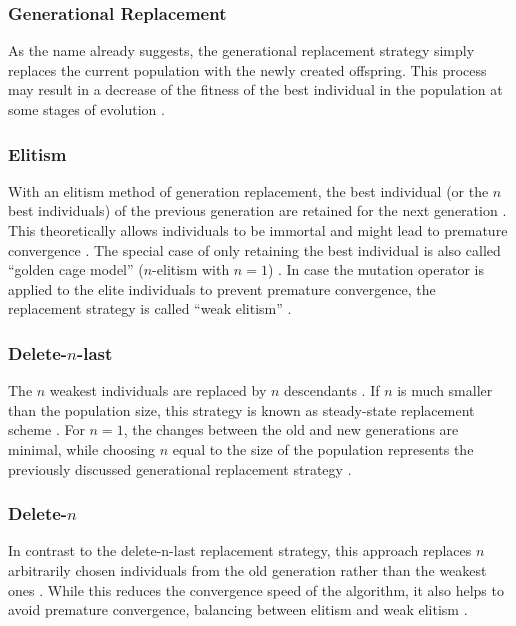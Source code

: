 \documentclass[sigconf]{acmart}
\begin{document}
\subsubsection{Generational Replacement}
\cite{Affenzeller2009}
As the name already suggests, the generational replacement strategy simply
replaces the current population with the newly created offspring.
This process may result in a decrease of the fitness of the best individual
in the population at some stages of evolution \cite{Affenzeller2009}.

\subsubsection{Elitism}
With an elitism method of generation replacement, the best individual
(or the $n$ best individuals) of the previous generation are retained for
the next generation \cite{Affenzeller2009, Katoch2021}.
This theoretically allows individuals to be immortal and might lead to
premature convergence \cite{Affenzeller2009}.
The special case of only retaining the best individual is also called
\enquote{golden cage model} ($n$-elitism with $n = 1$) \cite{Affenzeller2009}.
In case the mutation operator is applied to the elite individuals to prevent
premature convergence, the replacement strategy is called \enquote{weak elitism}
\cite{Affenzeller2009}.

\subsubsection{Delete-$n$-last}
The $n$ weakest individuals are replaced by $n$ descendants
\cite{Affenzeller2009}. If $n$ is much smaller than the population size, this
strategy is known as steady-state replacement scheme \cite{Affenzeller2009}.
For $n = 1$, the changes between the old and new generations are minimal, while
choosing $n$ equal to the size of the population represents the previously
discussed generational replacement strategy \cite{Affenzeller2009}.


\subsubsection{Delete-$n$}
In contrast to the delete-n-last replacement strategy, this approach replaces
$n$ arbitrarily chosen individuals from the old generation rather than the
weakest ones \cite{Affenzeller2009}.
While this reduces the convergence speed of the algorithm, it also helps to
avoid premature convergence, balancing between elitism and weak elitism
\cite{Affenzeller2009}.
\end{document}
